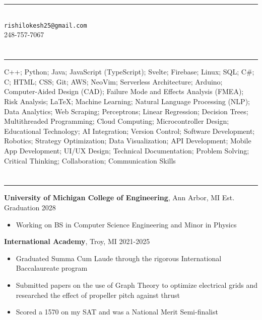 \documentclass{article}[11pt]
\newcommand{\underlinedsection}[1]{ \section*{\sc{#1}}
	\rule{\textwidth}{1pt} }
\newenvironment{denseitemize} %
{ \begin{itemize}[leftmargin = 20pt, topsep = 0pt, itemsep = 0pt] }
{\end{itemize} }
\newcommand{\education}[3]{ {\textbf{#1}, {#2} \hfill {#3}} }
\begin{document}
\normalsize
\singlespacing

\section*{\centering {}} 
\begin{center}
\rule{3in}{1pt} \\
\texttt{rishilokesh25@gmail.com} \\
248-757-7067 
\end{center} 

\underlinedsection{Skills}
C++; Python; Java; JavaScript (TypeScript); Svelte; Firebase; Linux; SQL; C#; C; HTML; CSS; Git; AWS; NeoVim; Serverless Architecture; Arduino; Computer-Aided Design (CAD); Failure Mode and Effects Analysis (FMEA); Risk Analysis; LaTeX; Machine Learning; Natural Language Processing (NLP); Data Analytics; Web Scraping; Perceptrons; Linear Regression; Decision Trees; Multithreaded Programming; Cloud Computing; Microcontroller Design; Educational Technology; AI Integration; Version Control; Software Development; Robotics; Strategy Optimization; Data Visualization; API Development; Mobile App Development; UI/UX Design; Technical Documentation; Problem Solving; Critical Thinking; Collaboration; Communication Skills

\underlinedsection{Education}
\education{University of Michigan College of Engineering}{Ann Arbor, MI}{Est. Graduation 2028}

\begin{denseitemize}
	\item Working on BS in Computer Science Engineering and Minor in Physics 
\end{denseitemize}
\education{International Academy}{Troy, MI}{2021-2025}
\begin{denseitemize}
	\item Graduated Summa Cum Laude through the rigorous International Baccalaureate program 
        \item Submitted papers on the use of Graph Theory to optimize electrical grids and researched the effect of propeller pitch against thrust
        \item Scored a 1570 on my SAT and was a National Merit Semi-finalist

\end{denseitemize}
\end{document}
